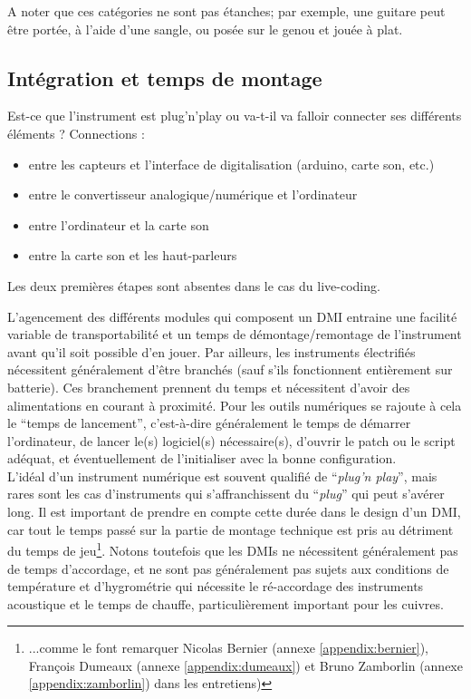 A noter que ces catégories ne sont pas étanches; par exemple, une guitare peut être portée, à l'aide d'une sangle, ou posée sur le genou et jouée à plat. 

\subsection{Intégration et temps de montage}

Est-ce que l'instrument est plug'n'play ou va-t-il va falloir connecter ses différents éléments ? Connections : 
\vspace{-1em}
\begin{itemize}[noitemsep]
	\item entre les capteurs et l'interface de digitalisation (arduino, carte son, etc.)
	\item entre le convertisseur analogique/numérique et l'ordinateur
	\item entre l'ordinateur et la carte son
	\item entre la carte son et les haut-parleurs
\end{itemize}

Les deux premières étapes sont absentes dans le cas du live-coding.

\noindent L'agencement des différents modules qui composent un \gls{DMI} entraine une facilité variable de transportabilité et un temps de démontage/remontage de l'instrument avant qu'il soit possible d'en jouer. Par ailleurs, les instruments électrifiés nécessitent généralement d'être branchés (sauf s'ils fonctionnent entièrement sur batterie). Ces branchement prennent du temps et nécessitent d'avoir des alimentations en courant à proximité. Pour les outils numériques se rajoute à cela le ``temps de lancement'', c'est-à-dire généralement le temps de démarrer l'ordinateur, de lancer le(s) logiciel(s) nécessaire(s), d'ouvrir le patch ou le script adéquat, et éventuellement de l'initialiser avec la bonne configuration.\\
\indent L'idéal d'un instrument numérique est souvent qualifié de ``\textit{plug'n play}'', mais rares sont les cas d'instruments qui s'affranchissent du ``\textit{plug}'' qui peut s'avérer long. Il est important de prendre en compte cette durée dans le design d'un \gls{DMI}, car tout le temps passé sur la partie de montage technique est pris au détriment du temps de jeu\footnote{...comme le font remarquer Nicolas Bernier (annexe \ref{appendix:bernier}), François Dumeaux (annexe \ref{appendix:dumeaux}) et Bruno Zamborlin (annexe \ref{appendix:zamborlin}) dans les entretiens)}. Notons toutefois que les \glspl{DMI} ne nécessitent généralement pas de temps d'accordage, et ne sont pas généralement pas sujets aux conditions de température et d'hygrométrie qui nécessite le ré-accordage des instruments acoustique et le temps de chauffe, particulièrement important pour les cuivres.

